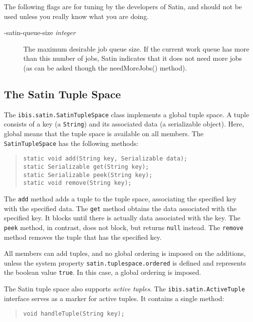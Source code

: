 \documentclass[10pt]{article}
\newcommand{\mysubsection}[1]{\subsection{#1}\label{#1}}
\begin{document}
The following flags are for tuning by the developers of Satin,
and should not be used unless you really know what you are doing.
\begin{description}
\item[-satin-queue-size \emph{integer}]
The maximum desirable job queue size. If the current work queue 
has more than this number of jobs, Satin indicates that 
it does not need more jobs (as can be asked though the
needMoreJobs() method).
\end{description}

\mysubsection{The Satin Tuple Space}

The \verb+ibis.satin.SatinTupleSpace+ class implements a global tuple
space.  A tuple consists of a key (a \texttt{String}) and its associated
data (a serializable object). Here, global means that the tuple space is
available on all members. The \verb+SatinTupleSpace+ has the following
methods:

\begin{quote}
\begin{verbatim}
static void add(String key, Serializable data);
static Serializable get(String key);
static Serializable peek(String key);
static void remove(String key);
\end{verbatim}
\end{quote}

The \verb+add+ method adds a tuple to the tuple space, associating the
specified key with the specified data.
The \verb+get+ method obtains the data associated with the specified key.
It blocks until there is actually data associated with the key.
The \verb+peek+ method, in contrast, does not block, but returns
\verb+null+ instead.
The \verb+remove+ method removes the tuple that has the specified key.

All members can add tuples, and no global ordering is imposed on the
additions, unless the system property
\verb+satin.tuplespace.ordered+ is defined and represents the
boolean value \verb+true+. In this case, a global ordering is imposed.

The Satin tuple space also supports \emph{active tuples}.
The \verb+ibis.satin.ActiveTuple+ interface serves
as a marker for active tuples. It contains a single method:

\begin{quote}
\begin{verbatim}
void handleTuple(String key);
\end{verbatim}
\end{quote}
\end{document}

